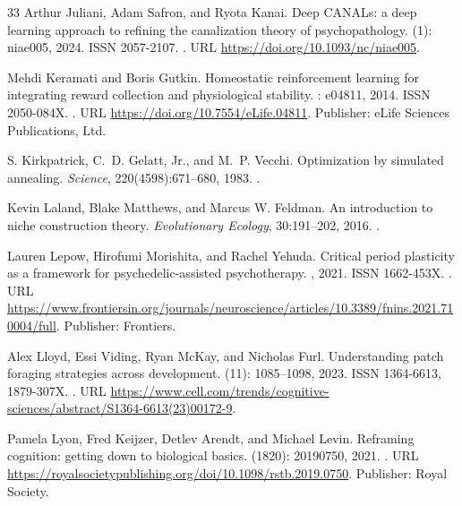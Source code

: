 \documentclass[12pt,fleqn]{article}
\begin{document}
\begin{thebibliography}{33}
  Arthur Juliani, Adam Safron, and Ryota Kanai.
  \newblock Deep {CANALs}: a deep learning approach to refining the canalization
  theory of psychopathology.
   (1): niae005, 2024.
  \newblock ISSN 2057-2107.
  \newblock {}.
  \newblock URL \url{https://doi.org/10.1093/nc/niae005}.

  Mehdi Keramati and Boris Gutkin.
  \newblock Homeostatic reinforcement learning for integrating reward collection
  and physiological stability.
  : e04811, 2014.
  \newblock ISSN 2050-084X.
  \newblock {}.
  \newblock URL \url{https://doi.org/10.7554/eLife.04811}.
  \newblock Publisher: {eLife} Sciences Publications, Ltd.

  S. Kirkpatrick, C.~D. Gelatt, Jr., and M.~P. Vecchi.
  \newblock Optimization by simulated annealing.
  \newblock \emph{Science}, 220(4598):671--680, 1983.
  \newblock {}.

  Kevin Laland, Blake Matthews, and Marcus W. Feldman.
  \newblock An introduction to niche construction theory.
  \newblock \emph{Evolutionary Ecology}, 30:191--202, 2016.
  \newblock {}.

  Lauren Lepow, Hirofumi Morishita, and Rachel Yehuda.
  \newblock Critical period plasticity as a framework for psychedelic-assisted
  psychotherapy.
  , 2021.
  \newblock ISSN 1662-453X.
  \newblock {}.
  \newblock URL
  \url{https://www.frontiersin.org/journals/neuroscience/articles/10.3389/fnins.2021.710004/full}.
  \newblock Publisher: Frontiers.

  Alex Lloyd, Essi Viding, Ryan McKay, and Nicholas Furl.
  \newblock Understanding patch foraging strategies across development.
   (11): 1085--1098, 2023.
  \newblock ISSN 1364-6613, 1879-307X.
  \newblock {}.
  \newblock URL
  \url{https://www.cell.com/trends/cognitive-sciences/abstract/S1364-6613(23)00172-9}.

  Pamela Lyon, Fred Keijzer, Detlev Arendt, and Michael Levin.
  \newblock Reframing cognition: getting down to biological basics.
   (1820): 20190750, 2021.
  \newblock {}.
  \newblock URL
  \url{https://royalsocietypublishing.org/doi/10.1098/rstb.2019.0750}.
  \newblock Publisher: Royal Society.


\end{thebibliography}
\end{document}
